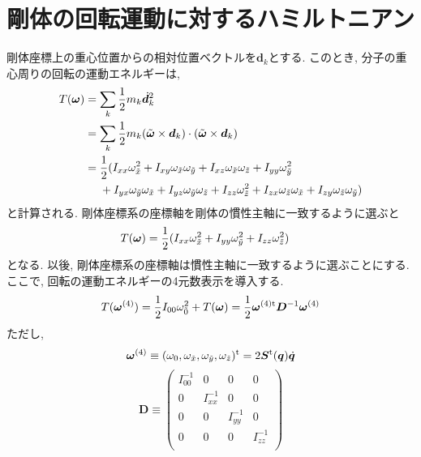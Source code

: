  \section{剛体の回転運動に対するハミルトニアン}
剛体座標上の重心位置からの相対位置ベクトルを$\bm{d}_{k}$とする. 
このとき, 分子の重心周りの回転の運動エネルギーは, 
\begin{align}
 T(\bm{\omega})
 &=
 \sum_{k} \frac{1}{2} m_{k} \dot{\bm{d}}_{k}^{2}
 \notag
 \\
 &=
 \sum_{k} \frac{1}{2} m_{k}
 (\tilde{\bm{\omega}} \times \bm{d}_{k})
 \cdot (\tilde{\bm{\omega}} \times \bm{d}_{k})
 \notag
 \\
 &=
 \frac{1}{2}
 (
 I_{xx} \omega_{\Tilde{x}}^{2}
+I_{xy} \omega_{\Tilde{x}}\omega_{\Tilde{y}}
+I_{xz} \omega_{\Tilde{x}}\omega_{\Tilde{z}}
+I_{yy} \omega_{\Tilde{y}}^{2}
\notag
\\ &~~~~
+I_{yx} \omega_{\Tilde{y}}\omega_{\Tilde{x}}
+I_{yz} \omega_{\Tilde{y}}\omega_{\Tilde{z}}
+I_{zz} \omega_{\Tilde{z}}^{2}
+I_{zx} \omega_{\Tilde{z}}\omega_{\Tilde{x}}
+I_{zy} \omega_{\Tilde{z}}\omega_{\Tilde{y}}
 )
\label{eq:RigidBodyMD17}
\end{align}
と計算される. 剛体座標系の座標軸を剛体の慣性主軸に一致するように選ぶと
\begin{align}
 T(\bm{\omega})
 &=
 \frac{1}{2}
 (
 I_{xx} \omega_{\Tilde{x}}^{2}
+I_{yy} \omega_{\Tilde{y}}^{2}
+I_{zz} \omega_{\Tilde{z}}^{2}
 )
\label{eq:RigidBodyMD18}
\end{align}
となる. 以後, 剛体座標系の座標軸は慣性主軸に一致するように選ぶことにする. \\
ここで, 回転の運動エネルギーの4元数表示を導入する. 
\begin{equation}
 T(\bm{\omega}^{(4)})
  =
  \frac{1}{2}I_{00}\omega_{\Tilde{0}}^{2} + T(\bm{\omega})
  =
  \frac{1}{2} \bm{\omega}^{(4) \mathrm{t}} \bm{D}^{-1} \bm{\omega}^{(4)}
\label{eq:RigidBodyMD19}
\end{equation}
ただし, 
\begin{equation}
 \bm{\omega}^{(4)}
  \equiv
  (\omega_{0},\omega_{\Tilde{x}},\omega_{\Tilde{y}},\omega_{\Tilde{z}})^{\mathrm{t}}
  =
 2\bm{S}^{\mathrm{t}} (\bm{q}) \dot{\bm{q}}
\label{eq:RigidBodyMD20}
\end{equation}
\begin{equation}
 \bm{D}
 \equiv
 \begin{pmatrix}
  I^{-1}_{00} & 0           & 0           & 0           \\
  0           & I^{-1}_{xx} & 0           & 0           \\
  0           & 0           & I^{-1}_{yy} & 0           \\
  0           & 0           & 0           & I^{-1}_{zz} \\
 \end{pmatrix}
\label{eq:RigidBodyMD21}
\end{equation}
